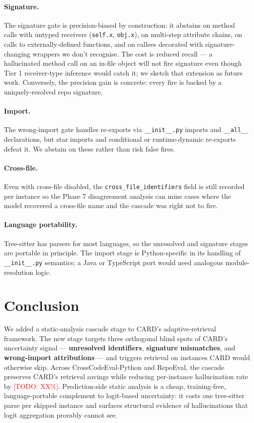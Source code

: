 \documentclass[10pt,twocolumn]{article}
\newcommand{\todo}[1]{\textcolor{red}{[TODO: #1]}}
\begin{document}
\paragraph{Signature.} The signature gate is precision-biased by
construction: it abstains on method calls with untyped receivers
(\texttt{self.x}, \texttt{obj.x}), on multi-step attribute chains,
on calls to externally-defined functions, and on callees decorated with
signature-changing wrappers we don't recognise. The cost is reduced
recall --- a hallucinated method call on an in-file object will not
fire signature even though Tier 1 receiver-type inference would catch
it; we sketch that extension as future work. Conversely, the precision
gain is concrete: every fire is backed by a uniquely-resolved repo
signature.

\paragraph{Import.} The wrong-import gate handles re-exports via
\texttt{\_\_init\_\_.py} imports and \texttt{\_\_all\_\_} declarations,
but star imports and conditional or runtime-dynamic re-exports defeat
it. We abstain on these rather than risk false fires.

\paragraph{Cross-file.} Even with cross-file disabled, the
\texttt{cross\_file\_identifiers} field is still recorded per instance
so the Phase 7 disagreement analysis can mine cases where the model
recovered a cross-file name and the cascade was right not to fire.

\paragraph{Language portability.} Tree-sitter has parsers for most
languages, so the unresolved and signature stages are portable in
principle. The import stage is Python-specific in its handling of
\texttt{\_\_init\_\_.py} semantics; a Java or TypeScript port would
need analogous module-resolution logic.

\section{Conclusion}

We added a static-analysis cascade stage to CARD's adaptive-retrieval
framework. The new stage targets three orthogonal blind spots of CARD's
uncertainty signal --- \textbf{unresolved identifiers},
\textbf{signature mismatches}, and \textbf{wrong-import attributions} ---
and triggers retrieval on instances CARD would otherwise skip. Across
CrossCodeEval-Python and RepoEval, the cascade preserves CARD's
retrieval savings while reducing per-instance hallucination rate by
\todo{XX\%}. Prediction-side static analysis is a cheap, training-free,
language-portable complement to logit-based uncertainty: it costs one
tree-sitter parse per skipped instance and surfaces structural evidence
of hallucinations that logit aggregation provably cannot see.



\end{document}

